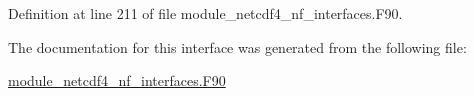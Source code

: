 Definition at line 211 of file module\+\_\+netcdf4\+\_\+nf\+\_\+interfaces.\+F90.



The documentation for this interface was generated from the following file\+:\begin{DoxyCompactItemize}
\item 
\hyperlink{module__netcdf4__nf__interfaces_8F90}{module\+\_\+netcdf4\+\_\+nf\+\_\+interfaces.\+F90}\end{DoxyCompactItemize}
